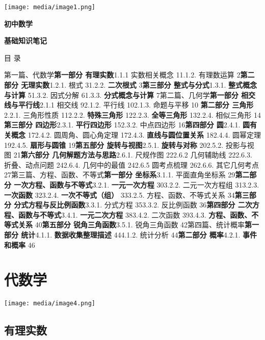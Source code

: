 \documentclass[a4paper,11pt,UTF8]{ctexart}
\begin{document}
\setcounter{tocdepth}{2}%
\tableofcontents
\clearpage

\texttt{[image: media/image1.png]}

\textbf{初中数学}

\textbf{基础知识笔记}

目 录

第一篇、代数学\textbf{第一部分 有理实数}1.1.1 实数相关概念 11.1.2.
有理数运算 2\textbf{第二部分 无理实数}1.2.1. 根式 31.2.2.
\textbf{二次根式} 3\textbf{第三部分 整式与分式}1.3.1.
\textbf{整式概念与计算} 51.3.2. 因式分解 61.3.3. \textbf{分式概念与计算}
7第二篇、几何学\textbf{第一部分 相交线与平行线}2.1.1 相交线 92.1.2.
平行线 102.1.3. 命题与平移 10 \textbf{第二部分 三角形}2.2.1. 三角形性质
112.2.2. \textbf{特殊三角形} 122.2.3. \textbf{全等三角形} 132.2.4.
相似三角形 14\textbf{第三部分 四边形}2.3.1. \textbf{平行四边形} 152.3.2.
中点四边形 16\textbf{第四部分 圆}2.4.1. \textbf{圆有关概念} 172.4.2.
圆周角、圆心角定理 172.4.3. \textbf{直线与圆位置关系} 182.4.4. 圆幂定理
192.4.5. \textbf{扇形与圆锥} 19\textbf{第五部分 旋转与视图}2.5.1.
\textbf{旋转与对称} 202.5.2. 投影与视图 21\textbf{第六部分
几何解题方法与思路}2.6.1. 尺规作图 222.6.2 几何辅助线 222.6.3.
折叠、动点问题 242.6.4. 几何中的最值 242.6.5 圆考点梳理 262.6.6.
其它几何考点 27第三篇、方程、函数、不等式\textbf{第一部分 坐标系}3.1.1.
平面直角坐标系 29\textbf{第二部分 一次方程、函数与不等式}3.2.1.
\textbf{一元一次方程} 303.2.2. 二元一次方程组 313.2.3. \textbf{一次函数}
323.2.4. \textbf{一次不等式（组）} 333.2.5. 方程、函数、不等式关系
34\textbf{第三部分 分式方程与反比例函数}3.3.1. 分式方程 353.3.2.
反比例函数 36\textbf{第四部分 二次方程、函数与不等式}3.4.1.
\textbf{一元二次方程} 383.4.2. 二次函数 393.4.3.
\textbf{方程、函数、不等式关系} 40\textbf{第五部分 锐角三角函数}3.5.1.
锐角三角函数 42第四篇、统计概率\textbf{第一部分 统计}4.1.1.
\textbf{数据收集整理描述} 444.1.2. 统计分析 44\textbf{第二部分
概率}4.2.1. \textbf{事件和概率} 46

\hypertarget{ux4ee3ux6570ux5b66}{%
\section{\texorpdfstring{ 代数学}{ 代数学}}\label{ux4ee3ux6570ux5b66}}

\texttt{[image: media/image4.png]}

\hypertarget{ux6709ux7406ux5b9eux6570}{%
\subsection{\texorpdfstring{
有理实数}{ 有理实数}}\label{ux6709ux7406ux5b9eux6570}}
\end{document}
